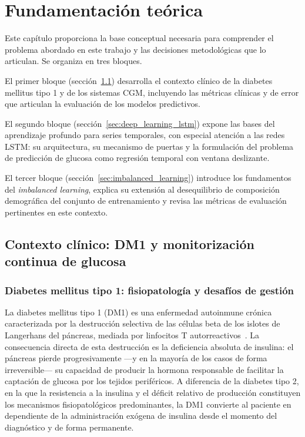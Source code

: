 \label{chapter:fundamentos}
\chapter[Fundamentación teórica]{Fundamentación teórica}

Este capítulo proporciona la base conceptual necesaria para comprender el problema abordado en este trabajo y las decisiones metodológicas que lo articulan. Se organiza en tres bloques.

El primer bloque (sección~\ref{sec:conceptos_clinicos}) desarrolla el contexto clínico de la diabetes mellitus tipo 1 y de los sistemas CGM, incluyendo las métricas clínicas y de error que articulan la evaluación de los modelos predictivos.

El segundo bloque (sección~\ref{sec:deep_learning_lstm}) expone las bases del aprendizaje profundo para series temporales, con especial atención a las redes LSTM: su arquitectura, su mecanismo de puertas y la formulación del problema de predicción de glucosa como regresión temporal con ventana deslizante.

El tercer bloque (sección~\ref{sec:imbalanced_learning}) introduce los fundamentos del \emph{imbalanced learning}, explica su extensión al desequilibrio de composición demográfica del conjunto de entrenamiento y revisa las métricas de evaluación pertinentes en este contexto.

\section{Contexto clínico: DM1 y monitorización continua de glucosa}
\label{sec:conceptos_clinicos}

\subsection{Diabetes mellitus tipo 1: fisiopatología y desafíos de gestión}
\label{subsec:dm1_fisiopatologia}

La diabetes mellitus tipo 1 (DM1) es una enfermedad autoinmune crónica caracterizada por la destrucción selectiva de las células beta de los islotes de Langerhans del páncreas, mediada por linfocitos T autorreactivos~\cite{atkinson2014type1}. La consecuencia directa de esta destrucción es la deficiencia absoluta de insulina: el páncreas pierde progresivamente —y en la mayoría de los casos de forma irreversible— su capacidad de producir la hormona responsable de facilitar la captación de glucosa por los tejidos periféricos. A diferencia de la diabetes tipo 2, en la que la resistencia a la insulina y el déficit relativo de producción constituyen los mecanismos fisiopatológicos predominantes, la DM1 convierte al paciente en dependiente de la administración exógena de insulina desde el momento del diagnóstico y de forma permanente.

